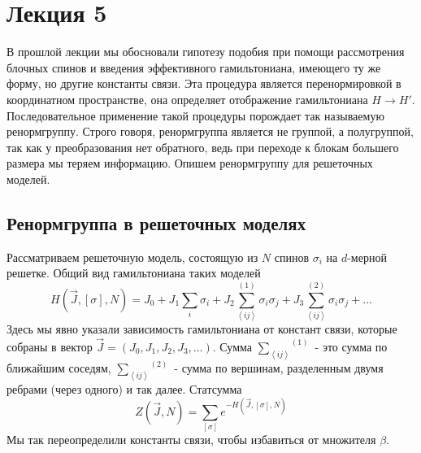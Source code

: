 \documentclass[a4paper,12pt]{article}
\theoremstyle{definition}
\theoremstyle{definition}
\theoremstyle{definition}
\begin{document}
\section{Лекция 5}
\label{sec:lecture-3}
В прошлой лекции мы обосновали гипотезу подобия при помощи рассмотрения блочных спинов и введения эффективного гамильтониана, имеющего ту же форму, но другие константы связи. Эта процедура является перенормировкой в координатном пространстве, она определяет отображение гамильтониана $H\to H'$. Последовательное применение такой процедуры порождает так называемую ренормгруппу. Строго говоря, ренормгруппа является не группой, а полугруппой, так как у преобразования нет обратного, ведь при переходе к блокам большего размера мы теряем информацию. 
Опишем ренормгруппу для решеточных моделей.

\subsection{Ренормгруппа в решеточных моделях}
\label{sec:renormgroup-lattice-models}
Рассматриваем решеточную модель, состоящую из $N$ спинов $\sigma_i$ на $d$-мерной решетке. Общий вид гамильтониана таких моделей
\begin{equation}
  \label{eq:55}
  H(\vec J,[\sigma],N)=J_0 + J_1\sum_i \sigma_i +J_2\overset{(1)}{\sum_{\left<ij\right>}}\sigma_i \sigma_j+J_3\overset{(2)}{\sum_{\left<ij\right>}}\sigma_i \sigma_j + \dots
\end{equation}
Здесь мы явно указали зависимость гамильтониана от констант связи, которые собраны в вектор $\vec J=(J_0,J_1,J_2,J_3,\dots)$. Сумма $\overset{(1)}{\sum_{\left<ij\right>}}$ - это сумма по ближайшим соседям, $\overset{(2)}{\sum_{\left<ij\right>}}$ - сумма по вершинам, разделенным двумя ребрами (через одного) и так далее. 
Статсумма
\begin{equation}
  \label{eq:56}
  Z(\vec J,N)=\sum_{[\sigma]}e^{-H(\vec J,[\sigma],N)}
\end{equation}
Мы так переопределили константы связи, чтобы избавиться от множителя $\beta$.
\end{document}
